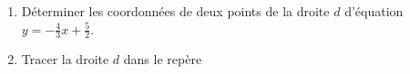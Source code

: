 
\begin{enumerate}
\item Déterminer les coordonnées de deux points de la droite $d$ d'équation $y=-\frac{4}{3} x+\frac{5}{2}$.
\item Tracer la droite $d$ dans le repère \Oij
\end{enumerate}

